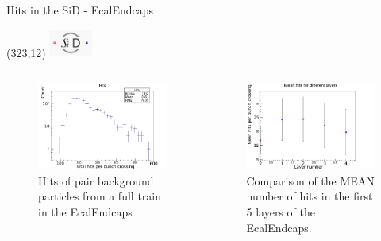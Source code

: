 \documentclass[xcolor={dvipsnames}]{beamer}
\newcommand{\sidlogo}{
  \setlength{\TPHorizModule}{1pt}
  \setlength{\TPVertModule}{1pt}
  \begin{textblock}{1}(323,12)
   \includegraphics[width=40pt,height=26pt]{figures/SiD.jpeg}
  \end{textblock}
  }
\begin{document}
\begin{frame}[label=HitsEcalEndcaps]{Hits in the SiD - EcalEndcaps}
\sidlogo
\begin{columns}
\begin{column}[T]{0.5\textwidth}
\begin{figure}
\centering
\includegraphics[width=\textwidth]{figures/sidloi3_pairs_1312_EcalEndcap_HitsPerFile_Hits.png}
\caption{\small Hits of pair background particles from a full train in the EcalEndcaps}
\end{figure}
\end{column}
\begin{column}[T]{0.5\textwidth}
\begin{figure}
\centering
\includegraphics[width=\textwidth]{figures/sidloi3_pairs_1312_EcalEndcap_Hits_EcalEndcap_MeanHits_0-4.png}
\caption{\small Comparison of the MEAN number of hits in the first 5 layers of the EcalEndcaps.}

\end{figure}
\end{column}
\end{columns}
\end{frame}
\end{document}
